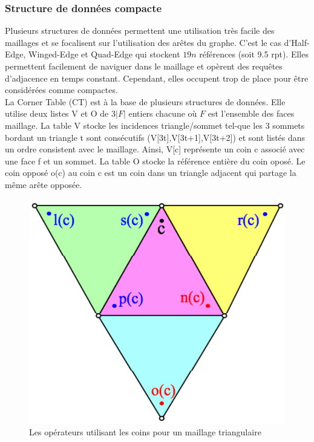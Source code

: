 \subsubsection{Structure de données compacte}
\noindent
Plusieurs structures de données permettent une utilisation très facile des maillages et se focalisent sur l'utilisation des arêtes du graphe. C'est le cas d'Half-Edge, Winged-Edge \cite{winged_edge} et Quad-Edge qui stockent $19n$ références (soit 9.5 rpt). Elles permettent facilement de naviguer dans le maillage et opèrent des requêtes d'adjacence en temps constant. Cependant, elles occupent trop de place pour être considérées comme compactes.\\
La Corner Table (CT) est à la base de plusieurs structures de données. Elle utilise deux listes V et O de $3|F|$ entiers chacune où $F$ est l'ensemble des faces maillage. La table V stocke les incidences triangle/sommet tel-que les 3 sommets bordant un triangle t sont consécutifs (V[3t],V[3t+1],V[3t+2]) et sont listés dans un ordre consistent avec le maillage. Ainsi, V[c] représente un coin c associé avec une face f et un sommet. La table O stocke la référence entière du coin oposé. Le coin opposé o(c) au coin c est un coin dans un triangle adjacent qui partage la même arête opposée.\\
\begin{figure}[H]
\begin{center}
\includegraphics[scale=0.2]{Images/corner_table}
\caption{Les opérateurs utilisant les coins pour un maillage triangulaire}
\label{fig:corner_table}
\end{center}
\end{figure}

